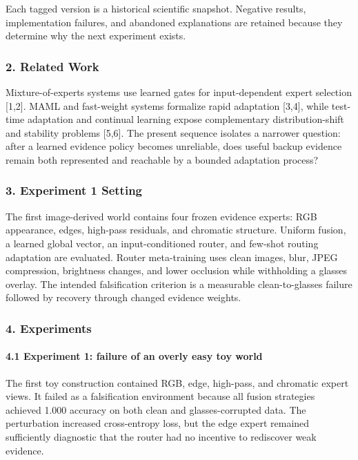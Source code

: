 \documentclass[
  10pt,
]{article}
\begin{document}
Each tagged version is a historical scientific snapshot. Negative
results, implementation failures, and abandoned explanations are
retained because they determine why the next experiment exists.

\hypertarget{related-work}{%
\subsubsection{2. Related Work}\label{related-work}}

Mixture-of-experts systems use learned gates for input-dependent expert
selection {[}1,2{]}. MAML and fast-weight systems formalize rapid
adaptation {[}3,4{]}, while test-time adaptation and continual learning
expose complementary distribution-shift and stability problems
{[}5,6{]}. The present sequence isolates a narrower question: after a
learned evidence policy becomes unreliable, does useful backup evidence
remain both represented and reachable by a bounded adaptation process?

\hypertarget{experiment-1-setting}{%
\subsubsection{3. Experiment 1 Setting}\label{experiment-1-setting}}

The first image-derived world contains four frozen evidence experts: RGB
appearance, edges, high-pass residuals, and chromatic structure. Uniform
fusion, a learned global vector, an input-conditioned router, and
few-shot routing adaptation are evaluated. Router meta-training uses
clean images, blur, JPEG compression, brightness changes, and lower
occlusion while withholding a glasses overlay. The intended
falsification criterion is a measurable clean-to-glasses failure
followed by recovery through changed evidence weights.

\hypertarget{experiments}{%
\subsubsection{4. Experiments}\label{experiments}}

\hypertarget{experiment-1-failure-of-an-overly-easy-toy-world}{%
\paragraph{4.1 Experiment 1: failure of an overly easy toy
world}\label{experiment-1-failure-of-an-overly-easy-toy-world}}

The first toy construction contained RGB, edge, high-pass, and chromatic
expert views. It failed as a falsification environment because all
fusion strategies achieved 1.000 accuracy on both clean and
glasses-corrupted data. The perturbation increased cross-entropy loss,
but the edge expert remained sufficiently diagnostic that the router had
no incentive to rediscover weak evidence.
\end{document}
